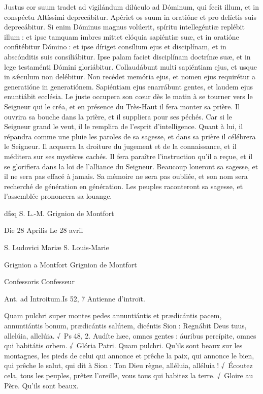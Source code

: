 \begin{paracol}{2}
Justus cor suum tradet ad  vigilándum dilúculo ad Dóminum, qui fecit illum, et in conspéctu Altíssimi deprecábitur. Apériet os suum in oratióne et pro delíctis suis deprecábitur. Si enim Dóminus magnus volúerit, spíritu intellegéntiæ replébit illum : et ipse tamquam imbres mittet elóquia sapiéntiæ suæ, et in oratióne confitébitur Dómino : et ipse díriget consílium ejus et disciplínam, et in abscónditis suis consiliábitur. Ipse palam faciet disciplínam doctrínæ suæ, et in lege testaménti Dómini gloriábitur. Collaudábunt multi sapiéntiam ejus, et usque in sǽculum non delébitur. Non recédet memória ejus, et nomen ejus requirétur a generatióne in generatiónem. Sapiéntiam ejus enarrábunt gentes, et laudem ejus enuntiábit ecclésia.
\switchcolumn
Le juste occupera son cœur dès le matin  à se tourner vers le Seigneur qui le créa, et en présence du Très-Haut il fera monter sa prière. Il ouvrira sa bouche dans la prière, et il suppliera pour ses péchés. Car si le Seigneur grand le veut, il le remplira de l’esprit d’intelligence. Quant à lui, il répandra comme une pluie les paroles de sa sagesse, et dans sa prière il célébrera le Seigneur. Il acquerra la droiture du jugement et de la connaissance, et il méditera sur ses mystères cachés. Il fera paraître l’instruction qu’il a reçue, et il se glorifiera dans la loi de l’alliance du Seigneur. Beaucoup loueront sa sagesse, et il ne sera pas effacé à jamais. Sa mémoire ne sera pas oubliée, et son nom sera recherché de génération en génération. Les peuples raconteront sa sagesse, et l’assemblée prononcera sa louange.
\switchcolumn*

dfsq
\switchcolumn
S. L.-M. Grignion de Montfort
\switchcolumn*

Die 28 Aprilis
\switchcolumn
Le 28 avril
\switchcolumn*

S. Ludovici Mariæ
\switchcolumn
S. Louis-Marie
\switchcolumn*

Grignion a Montfort
\switchcolumn
Grignion de Montfort
\switchcolumn*

Confessoris
\switchcolumn
Confesseur
\switchcolumn*

Ant. ad Introitum.\hfill Is 52, 7
\switchcolumn
Antienne d’introït.
\switchcolumn*

Quam pulchri super montes pedes annuntiántis et prædicántis pacem, annuntiántis bonum, prædicántis salútem, dicéntis Sion : Regnábit Deus tuus, allelúia, allelúia. √~Ps 48, 2. Audíte hæc, omnes gentes : áuribus percípite, omnes qui habitátis orbem. √~Glória Patri. Quam pulchri.
\switchcolumn
Qu’ils sont beaux sur les montagnes, les pieds de celui qui annonce et prêche la paix, qui annonce le bien, qui prêche le salut, qui dit à Sion : Ton Dieu règne, alléluia, alléluia ! √~Écoutez cela, tous les peuples, prêtez l’oreille, vous tous qui habitez la terre. √~Gloire au Père. Qu’ils sont beaux.
\switchcolumn*


\end{paracol}
